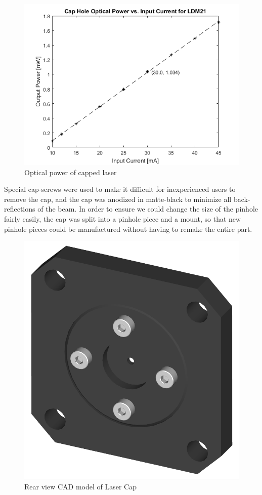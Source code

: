 \documentclass{article}
\begin{document}
    \begin{figure}[h]
        \centering
        \includegraphics[scale = 0.6]{img/cap_power_plot}
        \caption{Optical power of capped laser}
        \label{fig:cap_power_plot}
    \end{figure}
    
    Special cap-screws were used to make it difficult for inexperienced users to remove the cap, and the cap was anodized in matte-black to minimize all back-reflections of the beam. In order to ensure we could change the size of the pinhole fairly easily, the cap was split into a pinhole piece and a mount, so that new pinhole pieces could be manufactured without having to remake the entire part.
    
    \begin{figure}[h]
        \centering
        \includegraphics[scale = 0.2]{img/laser_cap_cad}
        \caption{Rear view CAD model of Laser Cap}
        \label{fig:laser_cap_cad}
    \end{figure}
    
\end{document}
